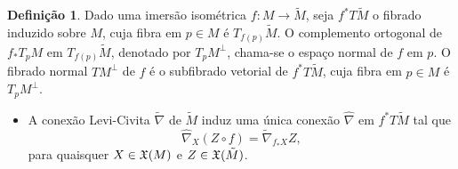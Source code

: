 \documentclass[10pt,a4paper]{beamer}
\theoremstyle{definition}
\newtheorem{definicao}{Definição}
\begin{document}
\begin{frame}

	\begin{definicao}
		Dado uma imersão isométrica $f: M \rightarrow \tilde{M}$, seja $f^* T\tilde{M}$ o \alert{fibrado induzido} sobre $M$, cuja fibra em $p \in M$ é $T_{f(p)} \tilde{M}$. O complemento ortogonal de $f_* T_p M$ em $T_{f(p)} \tilde{M}$, denotado por $T_p M^\perp$, chama-se o \alert{espaço normal} de $f$ em $p$. O \alert{fibrado normal} $TM^\perp$ de $f$ é o subfibrado vetorial de $f^* T \tilde{M}$, cuja fibra em $p \in M$ é $T_p M^\perp$.  
	\end{definicao}

	\begin{itemize}
		\pause
		\item 	A conexão Levi-Civita $\tilde{\nabla}$ de $\tilde{M}$ induz uma única conexão $\hat{\nabla}$ em $f^* T \tilde{M}$ tal que
		\begin{equation*}
		\hat{\nabla}_X (Z \circ f) = \tilde{\nabla}_{f_* X} Z, 
		\end{equation*}
		para quaisquer $X \in \mathfrak{X}(M)$ e $Z \in \mathfrak{X}(\tilde{M})$.
	\end{itemize}
	
\end{frame}
\end{document}
